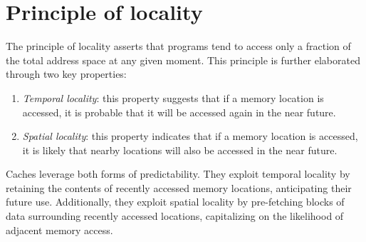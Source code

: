 \section{Principle of locality}

The principle of locality asserts that programs tend to access only a fraction of the total address space at any given moment. 
This principle is further elaborated through two key properties:
\begin{enumerate}
    \item \textit{Temporal locality}: this property suggests that if a memory location is accessed, it is probable that it will be accessed again in the near future.
    \item \textit{Spatial locality}: this property indicates that if a memory location is accessed, it is likely that nearby locations will also be accessed in the near future.
\end{enumerate}
Caches leverage both forms of predictability. 
They exploit temporal locality by retaining the contents of recently accessed memory locations, anticipating their future use. 
Additionally, they exploit spatial locality by pre-fetching blocks of data surrounding recently accessed locations, capitalizing on the likelihood of adjacent memory access.

